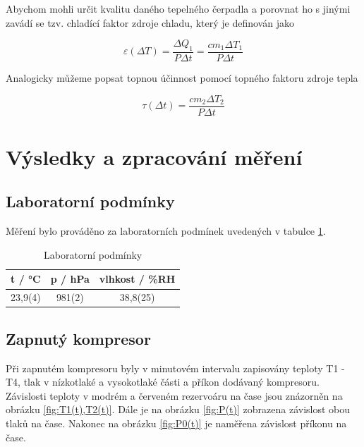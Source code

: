 Abychom mohli určit kvalitu daného tepelného čerpadla a porovnat ho s jinými zavádí se tzv. chladící faktor zdroje chladu, který je definován jako

\begin{equation}
    \varepsilon (\Delta T) = \frac{\Delta Q_1}{P \Delta t} = \frac{c m_1 \Delta T_1}{P \Delta t}
\end{equation}

Analogicky můžeme popsat topnou účinnost pomocí topného faktoru zdroje tepla

\begin{equation}
    \tau (\Delta t) = \frac{c m_2 \Delta T_2}{P \Delta t}
\end{equation}

\section{Výsledky a zpracování měření}

\subsection{Laboratorní podmínky}

    Měření bylo prováděno za laboratorních podmínek uvedených v tabulce \ref{tab:laboratorni-podminky}.

    \begin{table}[h]
        \centering
        \begin{tabular}{|c|c|c|} 
        \hline
            t / °C & p / hPa & vlhkost / \%RH  \\ 
        \hline
            23,9(4)   & 981(2)   & 38,8(25)            \\
        \hline
        \end{tabular}
        \caption{Laboratorní podmínky}
        \label{tab:laboratorni-podminky}
    \end{table}

\subsection{Zapnutý kompresor}

Při zapnutém kompresoru byly v minutovém intervalu zapisovány teploty T1 - T4, tlak v nízkotlaké a vysokotlaké části a příkon dodávaný kompresoru. Závislosti teploty v modrém a červeném rezervoáru na čase jsou znázorněn na obrázku \ref{fig:T1(t),T2(t)}. Dále je na obrázku \ref{fig:P(t)} zobrazena závislost obou tlaků na čase. Nakonec na obrázku \ref{fig:P0(t)} je naměřena závislost příkonu na čase.


